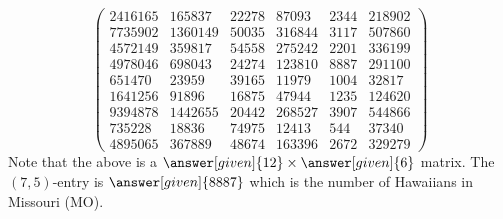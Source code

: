 \documentclass{ximera}
\begin{document}
\begin{example}
\begin{explanation}
\[\begin{pmatrix}
        2416165 & 165837 & 22278 & 87093 & 2344 & 218902\\
        7735902 & 1360149 & 50035 & 316844 & 3117 & 507860\\
        4572149 & 359817 & 54558 & 275242 & 2201 & 336199\\
        4978046 & 698043 & 24274 & 123810 & 8887 & 291100\\
        651470 & 23959 & 39165 & 11979 & 1004 & 32817\\
        1641256 & 91896 & 16875 & 47944 & 1235 & 124620\\
        9394878 & 1442655 & 20442 & 268527 & 3907 & 544866\\
        735228 & 18836 & 74975 & 12413 & 544 & 37340\\
        4895065 & 367889 & 48674 & 163396 & 2672 & 329279
      \end{pmatrix}
    \]
    Note that the above is a $\answer[given]{12}\times \answer[given]{6}$ matrix. The $(7, 5)$-entry is
    $\answer[given]{8887}$ which is the number of Hawaiians in Missouri (MO).
  \end{explanation}
\end{example}
\end{document}
